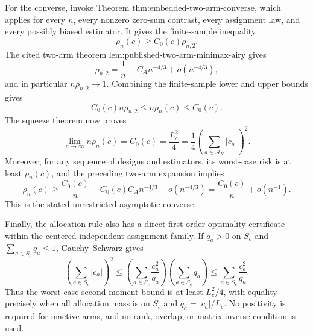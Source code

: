 For the converse, invoke Theorem \(\text{thm:embedded-two-arm-converse}\), which applies for every \(n\), every nonzero zero-sum contrast, every assignment law, and every possibly biased estimator.  It gives the finite-sample inequality
\[
 \rho_n(c)\geq C_0(c)\rho_{n,2}.
\]
The cited two-arm theorem \(\text{lem:published-two-arm-minimax-airy}\) gives
\[
 \rho_{n,2}=\frac1n-C_A n^{-4/3}+o(n^{-4/3}),
\]
and in particular \(n\rho_{n,2}\to1\).  Combining the finite-sample lower and upper bounds gives
\[
 C_0(c)n\rho_{n,2}\leq n\rho_n(c)\leq C_0(c).
\]
The squeeze theorem now proves
\[
 \lim_{n\to\infty}n\rho_n(c)=C_0(c)
 =\frac{L_c^2}{4}
 =\frac14\left(\sum_{a\in\mathcal A_K}|c_a|\right)^2.
\]
Moreover, for any sequence of designs and estimators, its worst-case risk is at least \(\rho_n(c)\), and the preceding two-arm expansion implies
\[
 \rho_n(c)\geq\frac{C_0(c)}n-C_0(c)C_A n^{-4/3}+o(n^{-4/3})
 =\frac{C_0(c)}n+o(n^{-1}).
\]
This is the stated unrestricted asymptotic converse.

Finally, the allocation rule also has a direct first-order optimality certificate within the centered independent-assignment family.  If \(q_a>0\) on \(S_c\) and \(\sum_{a\in S_c}q_a\leq1\), Cauchy--Schwarz gives
\[
 \left(\sum_{a\in S_c}|c_a|\right)^2
 \leq\left(\sum_{a\in S_c}\frac{c_a^2}{q_a}\right)
 \left(\sum_{a\in S_c}q_a\right)
 \leq\sum_{a\in S_c}\frac{c_a^2}{q_a}.
\]
Thus the worst-case second-moment bound is at least \(L_c^2/4\), with equality precisely when all allocation mass is on \(S_c\) and \(q_a=|c_a|/L_c\).  No positivity is required for inactive arms, and no rank, overlap, or matrix-inverse condition is used.